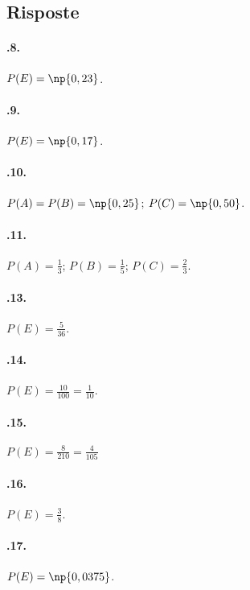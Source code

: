 \subsection{Risposte}
\begin{multicols}{2}

\paragraph{\thechapter.8.} $P(E)=\np{0,23}$.

\paragraph{\thechapter.9.} $P(E)=\np{0,17}$.

\paragraph{\thechapter.10.} $P(A)=P(B)=\np{0,25}$; $P(C)=\np{0,50}$.

\paragraph{\thechapter.11.} $ P(A)=\frac{1}{3}$; $P(B)=\frac{1}{5}$; $P(C)=\frac{2}{3} $.

\paragraph{\thechapter.13.} $P(E)=\frac 5{36}$.

\paragraph{\thechapter.14.} $P(E)=\frac{10}{100}=\frac 1{10}$.

\paragraph{\thechapter.15.} $P(E)=\frac 8{210}=\frac 4{105}$

\paragraph{\thechapter.16.} $P(E)=\frac 3 8$.

\paragraph{\thechapter.17.} $P(E)=\np{0,0375}$.


\end{multicols}

